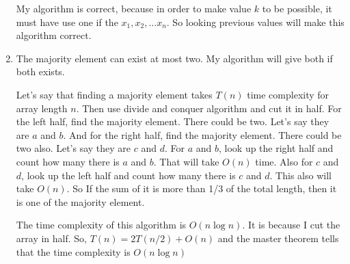 \documentclass[a4paper,11pt]{article}
\begin{document}
\begin{enumerate}
My algorithm is correct, because in order to make value $k$ to be possible, it must have use one if the $x_1,x_2, ... x_n$. So looking previous values will make this algorithm correct.


\item

The majority element can exist at most two. My algorithm will give both if both exists.

Let's say that finding a majority element takes $T(n)$  time complexity for array length $n$. Then use divide and conquer algorithm and cut it in half.
For the left half, find the majority element. There could be two. Let's say they are $a$ and $b$. And for the right half, find the majority element. There could be two also. Let's say they are $c$ and $d$. For $a$ and $b$, look up the right half and count how many there is $a$ and $b$. That will take $O(n)$ time. Also for $c$ and $d$, look up the left half and count how many there is $c$ and $d$. This also will take $O(n)$. So If the sum of it is more than 1/3 of the total length, then it is one of the majority element.

The time complexity of this algorithm is $O(n\log n)$. It is because I cut the array in half. So, $T(n) = 2T(n/2) + O(n)$ and the master theorem tells that the time complexity is $O(n \log n)$




\end{enumerate}
\end{document}

